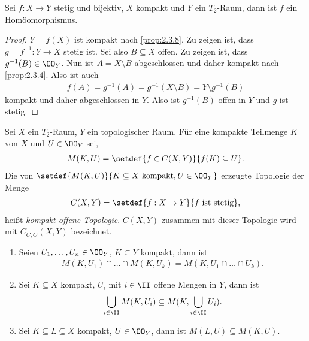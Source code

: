 \begin{prop}
\label{prop:2.3.14}
Sei $f:X\to Y$ stetig und bijektiv, $X$ kompakt und $Y$ ein $T_2$-Raum, dann
ist $f$ ein Homöomorphismus.\fishhere
\end{prop}
\begin{proof}
$Y=f(X)$ ist kompakt nach \ref{prop:2.3.8}. Zu zeigen ist, dass $g = f^{-1}:
Y\to X$ stetig ist. Sei also $B\subseteq X$ offen. Zu zeigen ist, dass
$g^{-1}(B)\in\OO_Y$. Nun ist $A=X\setminus B$ abgeschlossen und daher kompakt
nach \ref{prop:2.3.4}. Also ist auch
\begin{align*}
f(A) = g^{-1}(A) = g^{-1}(X\setminus B) =
Y\setminus g^{-1}(B)
\end{align*}
kompakt und daher abgeschlossen in $Y$. Also ist
$g^{-1}(B)$ offen in $Y$ und $g$ ist stetig.\qedhere
\end{proof}

\begin{defn}
\label{defn:2.3.15}
Sei $X$ ein $T_2$-Raum, $Y$ ein topologischer Raum. Für eine kompakte Teilmenge
$K$ von $X$ und $U\in\OO_Y$ sei,
\begin{align*}
M(K,U) = \setdef{f\in C(X,Y)}{f(K)\subseteq U}.
\end{align*}
Die von $\setdef{M(K,U)}{K\subseteq X\text{ kompakt}, U\in\OO_Y}$ erzeugte
Topologie der Menge
\begin{align*}
C(X,Y) = \setdef{f:X\to Y}{f\text{ ist stetig}},
\end{align*}
heißt \emph{kompakt offene Topologie}. $C(X,Y)$ zusammen mit dieser Topologie wird
mit \emph{$C_{C,O}(X,Y)$} bezeichnet.\fishhere
\end{defn}

\begin{prop}[Probleme]
\label{prop:2.3.16}
\begin{enumerate}
  \item Seien $U_1,\ldots,U_n\in\OO_Y$, $K\subseteq Y$ kompakt, dann ist
  \begin{align*}
  M(K,U_1)\cap\ldots\cap M(K,U_k) = M(K,U_1\cap\ldots\cap U_k).
  \end{align*}
  \item Sei $K\subseteq X$ kompakt, $U_i$ mit $i\in\II$ offene Mengen in $Y$,
  dann ist
  \begin{align*}
  \bigcup_{i\in\II} M(K,U_i) \subseteq M(K,\bigcup_{i\in\II} U_i).
  \end{align*}
  \item Sei $K\subseteq L\subseteq X$ kompakt, $U\in\OO_Y$,
  dann ist $M(L,U)\subseteq M(K,U)$.\fishhere
\end{enumerate}
\end{prop}


